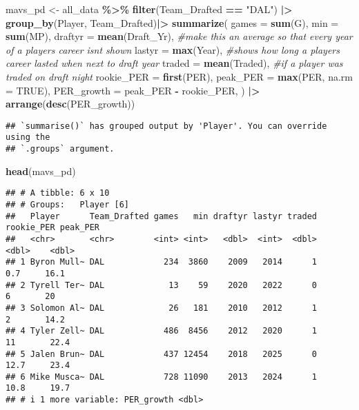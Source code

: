 \documentclass[
]{article}
\newenvironment{Shaded}{\begin{snugshade}}{\end{snugshade}}
\newcommand{\AttributeTok}[1]{\textcolor[rgb]{0.13,0.29,0.53}{#1}}
\newcommand{\CommentTok}[1]{\textcolor[rgb]{0.56,0.35,0.01}{\textit{#1}}}
\newcommand{\ConstantTok}[1]{\textcolor[rgb]{0.56,0.35,0.01}{#1}}
\newcommand{\FunctionTok}[1]{\textcolor[rgb]{0.13,0.29,0.53}{\textbf{#1}}}
\newcommand{\NormalTok}[1]{#1}
\newcommand{\OtherTok}[1]{\textcolor[rgb]{0.56,0.35,0.01}{#1}}
\newcommand{\SpecialCharTok}[1]{\textcolor[rgb]{0.81,0.36,0.00}{\textbf{#1}}}
\newcommand{\StringTok}[1]{\textcolor[rgb]{0.31,0.60,0.02}{#1}}
\begin{document}
\begin{Shaded}
\begin{Highlighting}[]
\NormalTok{mavs\_pd }\OtherTok{\textless{}{-}}\NormalTok{ all\_data }\SpecialCharTok{\%\textgreater{}\%} \FunctionTok{filter}\NormalTok{(Team\_Drafted }\SpecialCharTok{==} \StringTok{"DAL"}\NormalTok{) }\SpecialCharTok{|\textgreater{}} \FunctionTok{group\_by}\NormalTok{(Player, Team\_Drafted)}\SpecialCharTok{|\textgreater{}}
  \FunctionTok{summarize}\NormalTok{(}
    \AttributeTok{games =} \FunctionTok{sum}\NormalTok{(G),}
    \AttributeTok{min =} \FunctionTok{sum}\NormalTok{(MP),}
    \AttributeTok{draftyr =} \FunctionTok{mean}\NormalTok{(Draft\_Yr), }\CommentTok{\#make this an average so that every year of a player\textquotesingle{}s career isn\textquotesingle{}t shown}
    \AttributeTok{lastyr =} \FunctionTok{max}\NormalTok{(Year), }\CommentTok{\#shows how long a player\textquotesingle{}s career lasted when next to draft year}
    \AttributeTok{traded =} \FunctionTok{mean}\NormalTok{(Traded), }\CommentTok{\#if a player was traded on draft night}
    \AttributeTok{rookie\_PER =} \FunctionTok{first}\NormalTok{(PER),}
    \AttributeTok{peak\_PER =} \FunctionTok{max}\NormalTok{(PER, }\AttributeTok{na.rm =} \ConstantTok{TRUE}\NormalTok{),}
    \AttributeTok{PER\_growth =}\NormalTok{ peak\_PER }\SpecialCharTok{{-}}\NormalTok{ rookie\_PER,}
\NormalTok{    ) }\SpecialCharTok{|\textgreater{}}
  \FunctionTok{arrange}\NormalTok{(}\FunctionTok{desc}\NormalTok{(PER\_growth))}
\end{Highlighting}
\end{Shaded}

\begin{verbatim}
## `summarise()` has grouped output by 'Player'. You can override using the
## `.groups` argument.
\end{verbatim}

\begin{Shaded}
\begin{Highlighting}[]
\FunctionTok{head}\NormalTok{(mavs\_pd)}
\end{Highlighting}
\end{Shaded}

\begin{verbatim}
## # A tibble: 6 x 10
## # Groups:   Player [6]
##   Player      Team_Drafted games   min draftyr lastyr traded rookie_PER peak_PER
##   <chr>       <chr>        <int> <int>   <dbl>  <int>  <dbl>      <dbl>    <dbl>
## 1 Byron Mull~ DAL            234  3860    2009   2014      1        0.7     16.1
## 2 Tyrell Ter~ DAL             13    59    2020   2022      0        6       20  
## 3 Solomon Al~ DAL             26   181    2010   2012      1        2       14.2
## 4 Tyler Zell~ DAL            486  8456    2012   2020      1       11       22.4
## 5 Jalen Brun~ DAL            437 12454    2018   2025      0       12.7     23.4
## 6 Mike Musca~ DAL            728 11090    2013   2024      1       10.8     19.7
## # i 1 more variable: PER_growth <dbl>
\end{verbatim}
\end{document}
